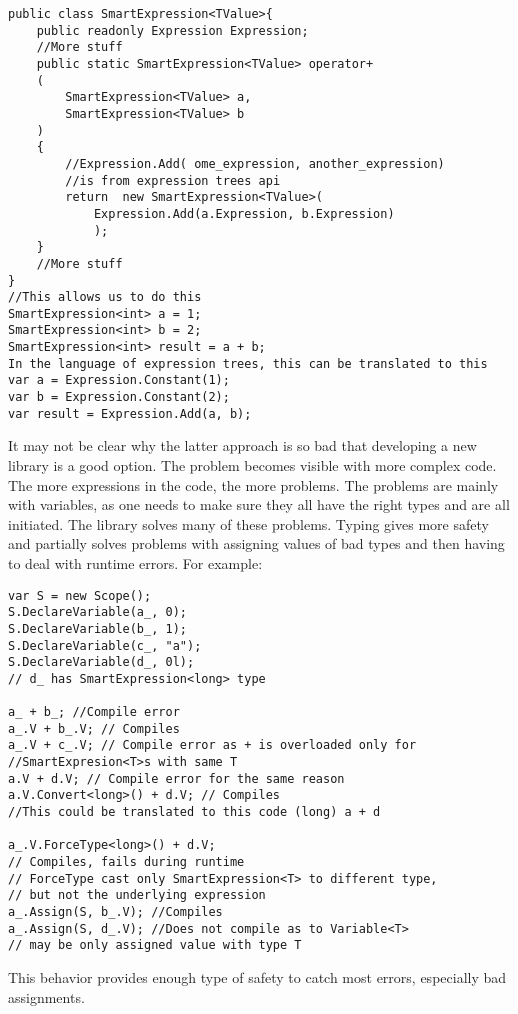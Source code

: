 \begin{lstlisting}
public class SmartExpression<TValue>{
    public readonly Expression Expression;
    //More stuff
    public static SmartExpression<TValue> operator+
    (
        SmartExpression<TValue> a, 
        SmartExpression<TValue> b
    )
    {
        //Expression.Add( ome_expression, another_expression) 
        //is from expression trees api
        return  new SmartExpression<TValue>(
            Expression.Add(a.Expression, b.Expression)
            );
    }
    //More stuff
}
//This allows us to do this
SmartExpression<int> a = 1;
SmartExpression<int> b = 2;
SmartExpression<int> result = a + b;
In the language of expression trees, this can be translated to this
var a = Expression.Constant(1);
var b = Expression.Constant(2);
var result = Expression.Add(a, b);
\end{lstlisting}
It may not be clear why the latter approach is so bad that developing a new library is a good option. The problem becomes visible with more complex code. The more expressions in the code, the more problems. The problems are mainly with variables, as one needs to make sure they all have the right types and are all initiated. The library solves many of these problems. Typing gives more safety and partially solves problems with assigning values of bad types and then having to deal with runtime errors. For example:
\begin{lstlisting}
var S = new Scope();
S.DeclareVariable(a_, 0);
S.DeclareVariable(b_, 1);
S.DeclareVariable(c_, "a");
S.DeclareVariable(d_, 0l); 
// d_ has SmartExpression<long> type

a_ + b_; //Compile error
a_.V + b_.V; // Compiles
a_.V + c_.V; // Compile error as + is overloaded only for 
//SmartExpresion<T>s with same T
a.V + d.V; // Compile error for the same reason
a.V.Convert<long>() + d.V; // Compiles
//This could be translated to this code (long) a + d 

a_.V.ForceType<long>() + d.V;
// Compiles, fails during runtime
// ForceType cast only SmartExpression<T> to different type,
// but not the underlying expression
a_.Assign(S, b_.V); //Compiles
a_.Assign(S, d_.V); //Does not compile as to Variable<T> 
// may be only assigned value with type T
\end{lstlisting}
This behavior provides enough type of safety to catch most errors, especially bad assignments.

